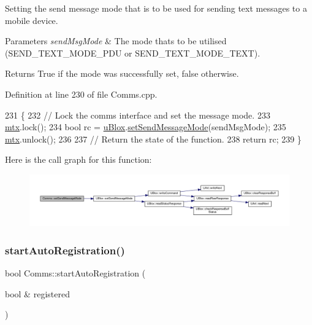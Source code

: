 Setting the send message mode that is to be used for sending text messages to a mobile device.


\begin{DoxyParams}{Parameters}
{\em send\+Msg\+Mode} & The mode that\textquotesingle{}s to be utilised (S\+E\+N\+D\+\_\+\+T\+E\+X\+T\+\_\+\+M\+O\+D\+E\+\_\+\+P\+DU or S\+E\+N\+D\+\_\+\+T\+E\+X\+T\+\_\+\+M\+O\+D\+E\+\_\+\+T\+E\+XT). \\
\hline
\end{DoxyParams}
\begin{DoxyReturn}{Returns}
True if the mode was successfully set, false otherwise. 
\end{DoxyReturn}


Definition at line 230 of file Comms.\+cpp.


\begin{DoxyCode}
231 \{
232     \textcolor{comment}{// Lock the comms interface and set the message mode.}
233     \hyperlink{class_comms_a21df861b1202573e4cd0cb5666d638fe}{mtx}.lock();
234     \textcolor{keywordtype}{bool} rc = \hyperlink{class_comms_ac64dea134b116147e5441172346dbd6c}{uBlox}.\hyperlink{class_u_blox_a12c1042d3bcb503b025927fd53d54243}{setSendMessageMode}(sendMsgMode);
235     \hyperlink{class_comms_a21df861b1202573e4cd0cb5666d638fe}{mtx}.unlock();
236 
237     \textcolor{comment}{// Return the state of the function.}
238     \textcolor{keywordflow}{return} rc;
239 \}
\end{DoxyCode}
Here is the call graph for this function\+:\nopagebreak
\begin{figure}[H]
\begin{center}
\leavevmode
\includegraphics[width=350pt]{d8/dcc/class_comms_a1b6f5cafba74fc0e175f057e15656362_cgraph}
\end{center}
\end{figure}
\mbox{\label{class_comms_a9563254514d2f64c0427be2aeaba26d8}} 
\subsubsection{\texorpdfstring{start\+Auto\+Registration()}{startAutoRegistration()}}
{\footnotesize\ttfamily bool Comms\+::start\+Auto\+Registration (\begin{DoxyParamCaption}\item[{bool \&}]{registered }\end{DoxyParamCaption})}


